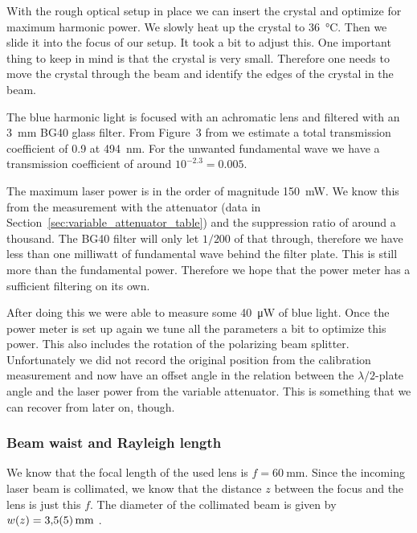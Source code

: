 \documentclass[11pt, english, fleqn, DIV=15, headinclude, BCOR=2cm]{scrreprt}
\begin{document}
With the rough optical setup in place we can insert the crystal and optimize
for maximum harmonic power. We slowly heat up the crystal to \SI{36}{\celsius}.
Then we slide it into the focus of our setup. It took a bit to adjust this. One
important thing to keep in mind is that the crystal is very small. Therefore
one needs to move the crystal through the beam and identify the edges of the
crystal in the beam.

The blue harmonic light is focused with an achromatic lens and filtered with an
\SI{3}{\milli\meter} BG40 glass filter. From Figure~3 from
\parencite{lab-course/doubling/manual} we estimate a total transmission
coefficient of \num{0.9} at \SI{494}{\nano\meter}. For the unwanted fundamental
wave we have a transmission coefficient of around $10^{-2.3} = 0.005$.

The maximum laser power is in the order of magnitude \SI{150}{\milli\watt}. We
know this from the measurement with the attenuator (data in
Section~\ref{sec:variable_attenuator_table}) and the suppression ratio of
around a thousand. The BG40 filter will only let $1/200$ of that through,
therefore we have less than one milliwatt of fundamental wave behind the filter
plate. This is still more than the fundamental power. Therefore we hope that
the power meter has a sufficient filtering on its own.

After doing this we were able to measure some \SI{40}{\micro\watt} of blue
light. Once the power meter is set up again we tune all the parameters a bit to
optimize this power. This also includes the rotation of the polarizing beam
splitter. Unfortunately we did not record the original position from the
calibration measurement and now have an offset angle in the relation between
the $\lambda/2$-plate angle and the laser power from the variable attenuator.
This is something that we can recover from later on, though.

\subsubsection{Beam waist and Rayleigh length}

We know that the focal length of the used lens is $f = \SI{60}{\milli\meter}$.
Since the incoming laser beam is collimated, we know that the distance $z$
between the focus and the lens is just this $f$. The diameter of the collimated
beam is given by $w(z) = \SI{3.5 +- 0.5}{\milli\meter}$
\parencite[8]{lab-course/doubling/manual}.
\end{document}
